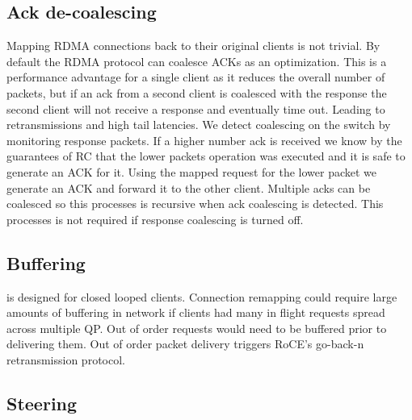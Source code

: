 \subsection{Ack de-coalescing}

Mapping RDMA connections back to their original clients is
not trivial. By default the RDMA protocol can coalesce ACKs
as an optimization. This is a performance advantage for a
single client as it reduces the overall number of packets,
but if an ack from a second client is coalesced with the
response the second client will not receive a response and
eventually time out. Leading to retransmissions and high
tail latencies. We detect coalescing on the switch by
monitoring response packets. If a higher number ack is
received we know by the guarantees of RC that the lower
packets operation was executed and it is safe to generate an
ACK for it. Using the mapped request for the lower packet we
generate an ACK and forward it to the other client. Multiple
acks can be coalesced so this processes is recursive when
ack coalescing is detected. This processes is not required
if response coalescing is turned off.

\subsection{Buffering}

\sword is designed for closed looped clients. Connection
remapping could require large amounts of buffering in
network if clients had many in flight requests spread across
multiple QP. Out of order requests would need to be buffered
prior to delivering them. Out of order packet delivery
triggers RoCE's go-back-n retransmission protocol.

\subsection{Steering}

